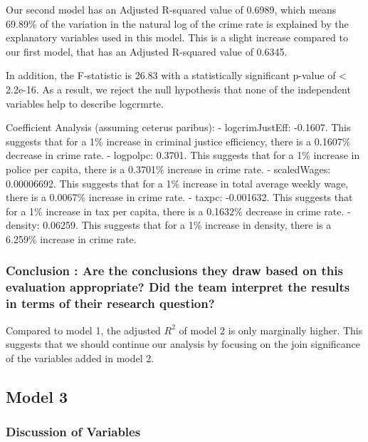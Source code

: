 \documentclass[]{article}
\begin{document}
Our second model has an Adjusted R-squared value of 0.6989, which means
69.89\% of the variation in the natural log of the crime rate is
explained by the explanatory variables used in this model. This is a
slight increase compared to our first model, that has an Adjusted
R-squared value of 0.6345.

In addition, the F-statistic is 26.83 with a statistically significant
p-value of \textless{} 2.2e-16. As a result, we reject the null
hypothesis that none of the independent variables help to describe
logcrmrte.

Coefficient Analysis (assuming ceterus paribus): - logcrimJustEff:
-0.1607. This suggests that for a 1\% increase in criminal justice
efficiency, there is a 0.1607\% decrease in crime rate. - logpolpc:
0.3701. This suggests that for a 1\% increase in police per capita,
there is a 0.3701\% increase in crime rate. - scaledWages: 0.00006692.
This suggests that for a 1\% increase in total average weekly wage,
there is a 0.0067\% increase in crime rate. - taxpc: -0.001632. This
suggests that for a 1\% increase in tax per capita, there is a 0.1632\%
decrease in crime rate. - density: 0.06259. This suggests that for a 1\%
increase in density, there is a 6.259\% increase in crime rate.

\hypertarget{conclusion-are-the-conclusions-they-draw-based-on-this-evaluation-appropriate-did-the-team-interpret-the-results-in-terms-of-their-research-question}{%
\subsubsection{Conclusion : Are the conclusions they draw based on this
evaluation appropriate? Did the team interpret the results in terms of
their research
question?}\label{conclusion-are-the-conclusions-they-draw-based-on-this-evaluation-appropriate-did-the-team-interpret-the-results-in-terms-of-their-research-question}}

Compared to model 1, the adjusted \(R^2\) of model 2 is only marginally
higher. This suggests that we should continue our analysis by focusing
on the join significance of the variables added in model 2.

\hypertarget{model-3}{%
\subsection{Model 3}\label{model-3}}

\hypertarget{discussion-of-variables}{%
\subsubsection{Discussion of Variables}\label{discussion-of-variables}}
\end{document}
